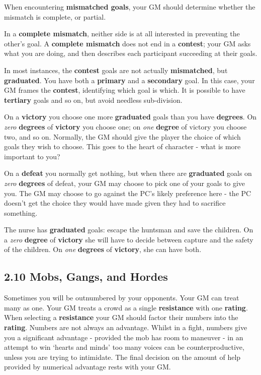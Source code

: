 \documentclass[
  11pt,
]{article}
\begin{document}
When encountering \textbf{mismatched goals}, your GM should determine
whether the mismatch is complete, or partial.

In a \textbf{complete mismatch}, neither side is at all interested in
preventing the other's goal. A \textbf{complete mismatch} does not end
in a \textbf{contest}; your GM asks what you are doing, and then
describes each participant succeeding at their goals.

In most instances, the \textbf{contest} goals are not actually
\textbf{mismatched}, but \textbf{graduated}. You have both a
\textbf{primary} and a \textbf{secondary} goal. In this case, your GM
frames the \textbf{contest}, identifying which goal is which. It is
possible to have \textbf{tertiary} goals and so on, but avoid needless
sub-division.

On a \textbf{victory} you choose one more \textbf{graduated} goals than
you have \textbf{degrees}. On \emph{zero} \textbf{degrees} of
\textbf{victory} you choose one; on \emph{one} \textbf{degree} of
victory you choose two, and so on. Normally, the GM should give the
player the choice of which goals they wish to choose. This goes to the
heart of character - what is more important to you?

On a \textbf{defeat} you normally get nothing, but when there are
\textbf{graduated} goals on \emph{zero} \textbf{degrees} of defeat, your
GM may choose to pick one of your goals to give you. The GM may choose
to go against the PC's likely preference here - the PC doesn't get the
choice they would have made given they had to sacrifice something.

The nurse has \textbf{graduated} goals: escape the huntsman and save the
children. On a \emph{zero} \textbf{degree} of \textbf{victory} she will
have to decide between capture and the safety of the children. On
\emph{one} \textbf{degrees} of \textbf{victory}, she can have both.

\hypertarget{mobs-gangs-and-hordes}{%
\subsection{2.10 Mobs, Gangs, and Hordes}\label{mobs-gangs-and-hordes}}

Sometimes you will be outnumbered by your opponents. Your GM can treat
many as one. Your GM treats a crowd as a single \textbf{resistance} with
one \textbf{rating}. When selecting a \textbf{resistance} your GM should
factor their numbers into the \textbf{rating}. Numbers are not always an
advantage. Whilst in a fight, numbers give you a significant advantage -
provided the mob has room to maneuver - in an attempt to win `hearts and
minds' too many voices can be counterproductive, unless you are trying
to intimidate. The final decision on the amount of help provided by
numerical advantage rests with your GM.
\end{document}
